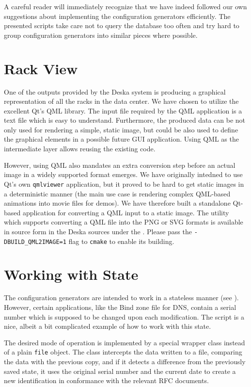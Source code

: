 \documentclass[deska]{subfiles}
\begin{document}
A careful reader will immediately recognize that we have indeed followed our own suggestions about implementing the
configuration generators efficiently.  The presented scripts take care not to query the database too often and try hard
to group configuration generators into similar pieces where possible.

\section{Rack View}
One of the outputs provided by the Deska system is producing a graphical representation of all the racks in the data
center.  We have chosen to utilize the excellent Qt's QML library.  The input file required by the QML application is a
text file which is easy to understand.  Furthermore, the produced data can be not only used for rendering a simple,
static image, but could be also used to define the graphical elements in a possible future GUI application.  Using QML
as the intermediate layer allows reusing the existing code.

However, using QML also mandates an extra conversion step before an actual image in a widely supported format emerges.
We have originally intedned to use Qt's own {\tt qmlviewer} application, but it proved to be hard to get static images
in a deterministic manner (the main use case is rendering complex QML-based animations into movie files for demos).  We
have therefore built a standalone Qt-based application for converting a QML input to a static image.  The utility which
supports converting a QML file into the PNG or SVG formats is available in source form in the Deska sources under the
.  Please pass the {\tt -DBUILD\_QML2IMAGE=1} flag to {\tt cmake} to enable its building.

\section{Working with State}

The configuration generators are intended to work in a stateless manner (see ).  However,
certain applications, like the Bind zone file for DNS, contain a serial number which is supposed to be changed upon each
modification.  The  script is a nice, albeit a bit complicated example of how to work with this state.

The desired mode of operation is implemented by a special wrapper class instead of a plain {\tt file} object.  The class
intercepts the data written to a file, comparing the data with the previous copy, and if it detects a difference from
the previously saved state, it uses the original serial number and the current date to create a new identification in
conformance with the relevant RFC documents.
\end{document}
